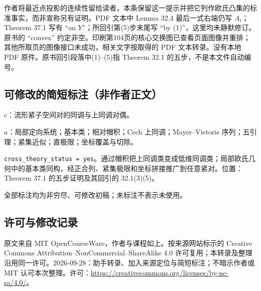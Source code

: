 \documentclass[UTF8,11pt]{ctexart}
\theoremstyle{definition}
\begin{document}
作者将最近点投影的连续性留给读者，本条保留这一提示并把它列作欧氏凸集的标准事实，而非宣称另有证明。PDF 文本中 Lemma 32.4 最后一式右端仍写 $A_i$；Theorem 37.1 写有 ``on $Y$''；所回引第(5)步末尾写 ``by (1)''，这里均未静默修订。原书的 ``convex'' 约定非空。印刷第104页的核心交换图已查看页面图像并重排；其他所取页的图像接口未成功，相关文字按取得的 PDF 文本转录。没有本地 PDF 原件。原书回引段落中(1)--(5)指 Theorem 32.1 的五步，不是本文件自动编号。
\subsection*{可修改的简短标注（非作者正文）}
$c$：流形紧子空间对的同调与上同调对偶。

$a$：局部定向系统；基本类；相对帽积；Cech 上同调；Mayer--Vietoris 序列；五引理；紧集近似；直极限；坐标覆盖与切除。

\texttt{cross\_theory\_status = yes}。通过帽积把上同调类变成低维同调类；局部欧氏几何中的基本类同构，经正合列、紧集极限和坐标拼接推广到任意紧对。位置：Theorem 37.1 的五步证明及其回引的 32.1(3)(5)。

全部标注均为非穷尽、可修改初稿；未标注不表示未使用。
\subsection*{许可与修改记录}
原文来自 MIT OpenCourseWare，作者与课程如上。按来源网站标示的 Creative Commons Attribution--NonCommercial--ShareAlike 4.0 许可复用；本转录及整理沿用同一许可。2026-09-28：助手转录、加入来源定位与简短标注；不暗示作者或 MIT 认可本次整理。许可：\url{https://creativecommons.org/licenses/by-nc-sa/4.0/}。
\end{document}
